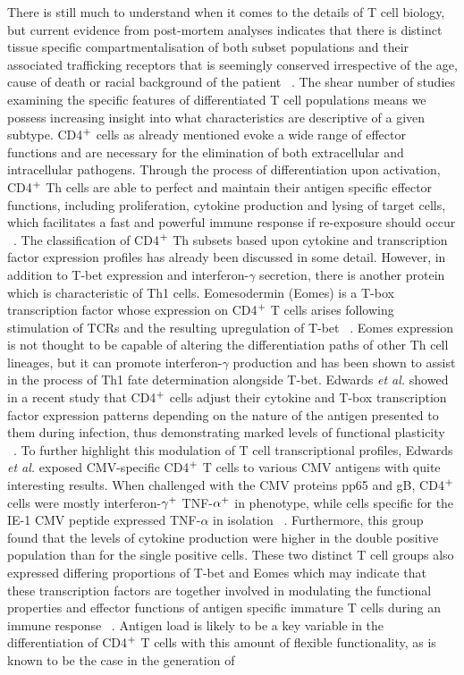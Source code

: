 There is still much to understand when it comes to the details of T cell biology, but current evidence from post-mortem analyses indicates that there is distinct tissue specific compartmentalisation of both subset populations and their associated trafficking receptors that is seemingly conserved irrespective of the age, cause of death or racial background of the patient ~\autocite{Won2016}. The shear number of studies examining the specific features of differentiated T cell populations means we possess increasing insight into what characteristics are descriptive of a given subtype. CD4$\textsuperscript{+}$ cells as already mentioned evoke a wide range of effector functions and are necessary for the elimination of both extracellular and intracellular pathogens. Through the process of differentiation upon activation, CD4$\textsuperscript{+}$ Th cells are able to perfect and maintain their antigen specific effector functions, including proliferation, cytokine production and lysing of target cells, which facilitates a fast and powerful immune response if re-exposure should occur ~\autocite{Edw2014}. The classification of CD4$\textsuperscript{+}$ Th subsets based upon cytokine and transcription factor expression profiles has already been discussed in some detail. However, in addition to T-bet expression and interferon-$\gamma$ secretion, there is another protein which is characteristic of Th1 cells. Eomesodermin (Eomes) is a T-box transcription factor whose expression on CD4$\textsuperscript{+}$ T cells arises following stimulation of TCRs and the resulting upregulation of T-bet ~\autocite{Edw2014}. Eomes expression is not thought to be capable of altering the differentiation paths of other Th cell lineages, but it can promote interferon-$\gamma$ production and has been shown to assist in the process of Th1 fate determination alongside T-bet. Edwards \textit{et al.} showed in a recent study that CD4$\textsuperscript{+}$ cells adjust their cytokine and T-box transcription factor expression patterns depending on the nature of the antigen presented to them during infection, thus demonstrating marked levels of functional plasticity ~\autocite{Edw2014}. To further highlight this modulation of T cell transcriptional profiles, Edwards \textit{et al.} exposed CMV-specific CD4$\textsuperscript{+}$ T cells to various CMV antigens with quite interesting results. When challenged with the CMV proteins pp65 and gB, CD4$\textsuperscript{+}$ cells were mostly interferon-$\gamma\textsuperscript{+}$ TNF-$\alpha\textsuperscript{+}$ in phenotype, while cells specific for the IE-1 CMV peptide expressed TNF-$\alpha$ in isolation ~\autocite{Edw2014}. Furthermore, this group found that the levels of cytokine production were higher in the double positive population than for the single positive cells. These two distinct T cell groups also expressed differing proportions of T-bet and Eomes which may indicate that these transcription factors are together involved in modulating the functional properties and effector functions of antigen specific immature T cells during an immune response ~\autocite{Edw2014}. Antigen load is likely to be a key variable in the differentiation of CD4$\textsuperscript{+}$ T cells with this amount of flexible functionality, as is known to be the case in the generation of 